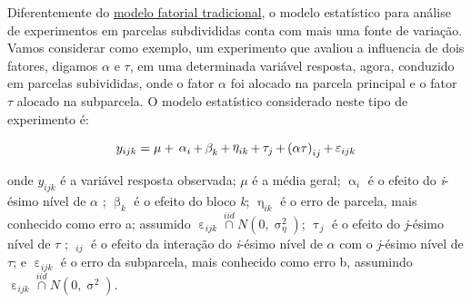 \documentclass[
]{book}
\numberwithin{equation}{section}
\begin{document}
Diferentemente do \protect\hyperlink{experimentos-bifatoriais}{modelo fatorial tradicional}, o modelo estatístico para análise de experimentos em parcelas subdivididas conta com mais uma fonte de variação. Vamos considerar como exemplo, um experimento que avaliou a influencia de dois fatores, digamos \(\alpha\) e \(\tau\), em uma determinada variável resposta, agora, conduzido em parcelas subivididas, onde o fator \(\alpha\) foi alocado na parcela principal e o fator \(\tau\) alocado na subparcela. O modelo estatístico considerado neste tipo de experimento é:

\[
{y_{ijk}} = {\rm{ }}\mu {\rm{ }} + {\rm{ }}\mathop \alpha \nolimits_i + \mathop \beta \nolimits_{k} + \mathop \eta \nolimits_{ik}  +\mathop \tau \nolimits_j  + \mathop {(\alpha \tau )}\nolimits_{ij}  + {\rm{ }}\mathop \varepsilon \nolimits_{ijk}
\]

onde \({y_{ijk}}\) é a variável resposta observada; \(\mu\) é a média geral; \(\mathop \alpha \nolimits_i\) é o efeito do \emph{i}-ésimo nível de \(\alpha\) ; \(\mathop \beta \nolimits_{k}\) é o efeito do bloco \emph{k}; \(\mathop \eta \nolimits_{ik}\) é o erro de parcela, mais conhecido como erro a; assumido \(\mathop \varepsilon \nolimits_{ijk} \mathop \cap \limits^{iid} N(0,\mathop \sigma \nolimits_\eta^2 )\); \(\mathop \tau \nolimits_j\) é o efeito do \emph{j}-ésimo nível de \(\tau\) ; \(\mathop {(\alpha \tau )}\nolimits_{ij}\) é o efeito da interação do \emph{i}-ésimo nível de \(\alpha\) com o \emph{j}-ésimo nível de \(\tau\); e \(\mathop \varepsilon \nolimits_{ijk}\) é o erro da subparcela, mais conhecido como erro b, assumindo \(\mathop \varepsilon \nolimits_{ijk} \mathop \cap \limits^{iid} N(0,\mathop \sigma \nolimits^2 )\).
\end{document}

